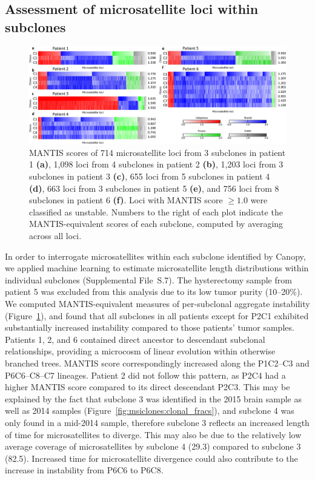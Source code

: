 \subsection{Assessment of microsatellite loci within subclones}

\begin{figure}[ht]
	\begin{center}
		\includegraphics[width=0.98\linewidth]{images/msiclones/subclonal_ms_heatmap}
	\end{center}
	\vspace{-0.4cm}
	\caption[Subclonal MANTIS-equivalent scores.]{MANTIS scores of 714 microsatellite loci from 3 subclones in patient 1 \textbf{(a)}, 1,098 loci from 4 subclones in patient 2 \textbf{(b)}, 1,203 loci from 3 subclones in patient 3 \textbf{(c)}, 655 loci from 5 subclones in patient 4 \textbf{(d)}, 663 loci from 3 subclones in patient 5 \textbf{(e)}, and 756 loci from 8 subclones in patient 6 \textbf{(f)}. Loci with MANTIS score $\ge 1.0$ were classified as unstable. Numbers to the right of each plot indicate the MANTIS-equivalent scores of each subclone, computed by averaging across all loci.}
	\label{fig:msiclones:clonal_ms_loci}
\end{figure}

In order to interrogate microsatellites within each subclone identified by Canopy, we applied machine learning to estimate microsatellite length distributions within individual subclones (Supplemental File~S\thechapter{}.7). The hysterectomy sample from patient 5 was excluded from this analysis due to its low tumor purity (10--20\%). We computed MANTIS-equivalent measures of per-subclonal aggregate instability (Figure~\ref{fig:msiclones:clonal_ms_loci}), and found that all subclones in all patients except for P2C1 exhibited substantially increased instability compared to those patients' tumor samples. Patients 1, 2, and 6 contained direct ancestor to descendant subclonal relationships, providing a microcosm of linear evolution within otherwise branched trees. MANTIS score correspondingly increased along the P1C2--C3 and P6C6--C8--C7 lineages. Patient 2 did not follow this pattern, as P2C4 had a higher MANTIS score compared to its direct descendant P2C3. This may be explained by the fact that subclone 3 was identified in the 2015 brain sample as well as 2014 samples (Figure~\ref{fig:msiclones:clonal_fracs}), and subclone 4 was only found in a mid-2014 sample, therefore subclone 3 reflects an increased length of time for microsatellites to diverge. This may also be due to the relatively low average coverage of microsatellites by subclone 4 (29.3\texttimes{}) compared to subclone 3 (82.5\texttimes{}). Increased time for microsatellite divergence could also contribute to the increase in instability from P6C6 to P6C8.

